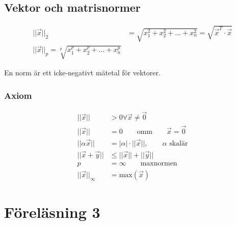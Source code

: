 \documentclass[a4paper,10pt,swedish]{memoir}
\numberwithin{equation}{subsection}
\begin{document}
\section{Vektor och matrisnormer}

\begin{align}
||\vec{x}||_2 &= \sqrt{x_1^2 + x_2^2 + \ldots + x_n^2} = \sqrt{\vec{x}^T\cdot\vec{x}} \\
||\vec{x}||_p = \sqrt[p]{x_1^p+x_2^p+\ldots+x^p_n}
\end{align}

En norm är ett icke-negativt mätetal för vektorer.

\subsection{Axiom}

\begin{align}
||\vec{x}|| & > 0 \forall \vec{x} \neq \vec{0} \\
||\vec{x}|| & = 0 \qquad \text{omm} \qquad \vec{x}=\vec{0} \\
||\alpha\vec{x}||&=|\alpha|\cdot||\vec{x}||, \qquad\text{$\alpha$ skalär} \\
||\vec{x}+\vec{y}|| &\leq ||\vec{x}||+||\vec{y}|| \\
p &= \infty \qquad \text{maxnormen}\\
||\vec{x}||_\infty &= \text{max}(\vec{x})
\end{align}

\chapter{Föreläsning 3}

\end{document}
